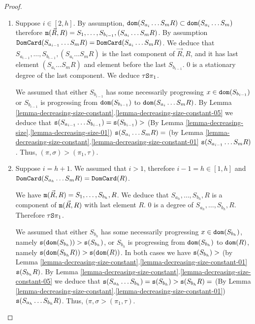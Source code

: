 \documentclass{lmcs}
\begin{document}
\begin{proof}
\begin{enumerate}
\begin{enumerate}
\begin{enumerate}
\item
Suppose $i \in [2,h]$. 
By assumption, ${\tt dom}(S_{a_{i}} \ldots S_{m} R) \subset {\tt dom}(S_{a_{i}} \ldots S_{m})$
 therefore ${\tt m}(\vec{R},R) = S_1, \ldots, S_{b_{i-1}}, (S_{a_i} \ldots S_m R)$.
 By assumption 
 ${\tt DomCard}(S_{a_{i-1}} \ldots S_{m} R) = {\tt DomCard}(S_{a_i} \ldots S_{m}R)$. 
 We deduce that $S_{a_{i-1}}, \ldots, S_{b_{i-1}}, (S_{a_i} \ldots S_m R)$
 is the last component of $\vec{R},R$, and it has last element 
 $(S_{a_i} \ldots S_m R)$ and element before the last $S_{b_{i-1}}$.
 $0$ is a stationary degree of the last component. We deduce $\tau {\tt S} \pi_1$.
 
 We assumed that either $S_{b_{i-1}}$ has some necessarily progressing
$x \in {\tt dom}(S_{b_{i-1}})$ or $S_{b_{i-1}}$ is progressing from ${\tt dom}(S_{b_{i-1}})$ 
to ${\tt dom}(S_{a_i} \ldots S_m R)$.  
 By Lemma \ref{lemma-decreasing-size-constant}.\ref{lemma-decreasing-size-constant-05} we deduce that 
 $
 {\tt s}(S_{a_{i-1}} \ldots S_{b_{i-1}}) = 
 {\tt s}(S_{b_{i-1}}) > 
 $ 
 (By Lemma \ref{lemma-decreasing-size}.\ref{lemma-decreasing-size-01}) 
 $
 {\tt s}(S_{a_i} \ldots S_m R) = 
 $
 (by Lemma \ref{lemma-decreasing-size-constant}.\ref{lemma-decreasing-size-constant-01}
 $ 
 {\tt s}(S_{a_{i-1}} \ldots S_m R)$. 
 Thus, $(\pi,\sigma) > (\pi_1,\tau)$.
 
 \item
 Suppose $i=h+1$. We assumed that $i>1$, therefore $i-1 = h \in [1,h]$ and 
 ${\tt DomCard}(S_{a_{h}} \ldots S_{m} R) = {\tt DomCard}(R)$. 
 
 We have ${\tt m}(\vec{R},R) = S_1, \ldots, S_{b_h}, R$. We deduce that 
 $S_{a_h}, \ldots, S_{b_h}, R$
 is a component of ${\tt m}(\vec{R},R)$ with last element $R$. 
 $0$ is a degree of $S_{a_h}, \ldots, S_{b_h}, R$. Therefore $\tau {\tt S} \pi_1$.
 
 We assumed that either $S_{b_h}$ has some necessarily progressing
$x \in {\tt dom}(S_{b_h})$, namely ${\tt s}({\tt dom}(S_{b_h})) > {\tt s}(S_{b_h})$, or 
 $S_{b_h}$ is progressing from ${\tt dom}(S_{b_h})$ to ${\tt dom}(R)$,
 namely ${\tt s}({\tt dom}(S_{b_h} R)) > {\tt s}({\tt dom}(R))$.
 In both cases we have 
 $
 {\tt s}(S_{b_h})  >
 $
 (by Lemma \ref{lemma-decreasing-size-constant}.\ref{lemma-decreasing-size-constant-01}
 $ 
 {\tt s}(S_{b_h} R)
 $.
 By Lemma \ref{lemma-decreasing-size-constant}.\ref{lemma-decreasing-size-constant-05} we deduce that 
 $
 {\tt s}(S_{a_h} \ldots S_{b_h}) =  
 {\tt s}(S_{b_h})  >
 {\tt s}(S_{b_h} R) = 
 $
 (By Lemma \ref{lemma-decreasing-size-constant}.\ref{lemma-decreasing-size-constant-01})
 ${\tt s}(S_{a_h} \ldots S_{b_h} R)$.  
 Thus, $(\pi,\sigma > (\pi_1, \tau)$.
 \end{enumerate}
 

\end{enumerate}
\end{enumerate}
\end{proof}
\end{document}
